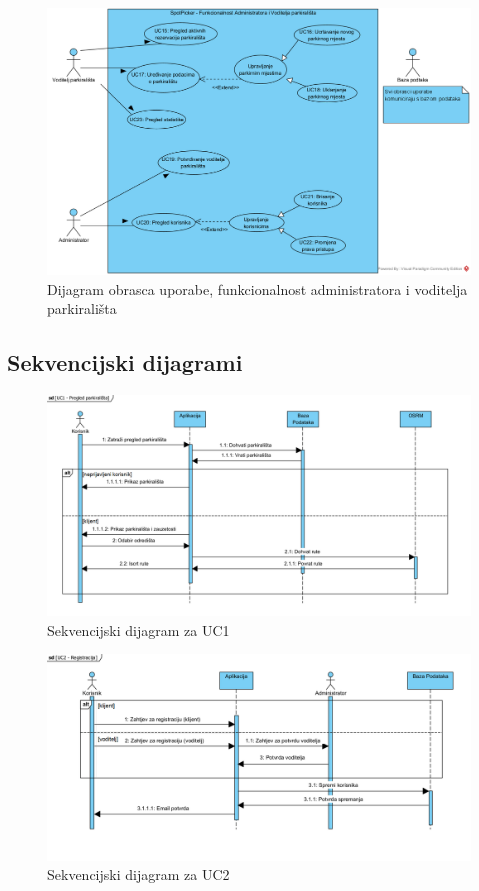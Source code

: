 					\begin{figure}[H]
						\centering
						\includegraphics[width=\textwidth]{slike/UCD2.PNG} 
						\caption{Dijagram obrasca uporabe, funkcionalnost administratora i voditelja parkirališta}
						\label{fig:promjene7} 
					\end{figure}
				\eject		
				
			\subsection{Sekvencijski dijagrami}
				
				\begin{figure}[H]
					\centering
					\includegraphics[width=\textwidth]{slike/SD_UC1.JPG} 
					\caption{Sekvencijski dijagram za UC1}
					\label{fig:promjene8} 
				\end{figure}
				
				\begin{figure}[H]
					\centering
					\includegraphics[width=\textwidth]{slike/SD_UC2.JPG} 
					\caption{Sekvencijski dijagram za UC2}
					\label{fig:promjene9} 
				\end{figure}
				

